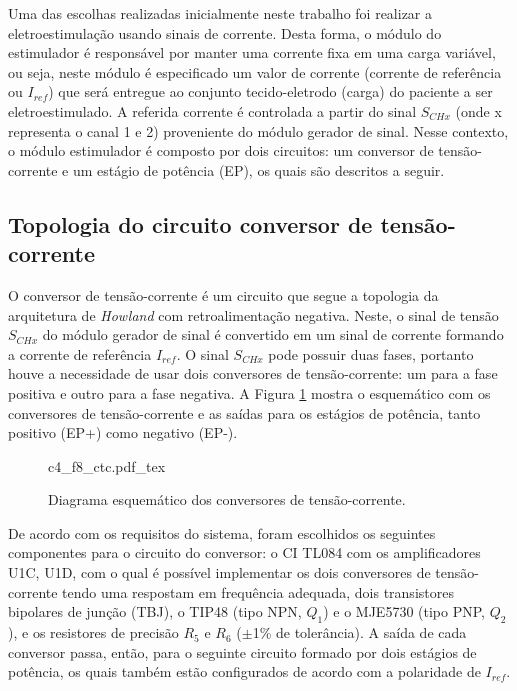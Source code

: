 Uma das escolhas realizadas inicialmente neste trabalho foi realizar a eletroestimulação usando sinais de corrente. Desta forma, o módulo do estimulador é responsável por manter uma corrente fixa em uma carga variável, ou seja, neste módulo é especificado um valor de corrente (corrente de referência ou $I_{ref}$) que será entregue ao conjunto tecido-eletrodo (carga) do paciente a ser eletroestimulado. A referida corrente é controlada a partir do sinal $S_{CHx}$ (onde x representa o canal 1 e 2) proveniente do módulo gerador de sinal. Nesse contexto, o módulo estimulador é composto por dois circuitos: um conversor de tensão-corrente e um estágio de potência (\acrshort{EP}), os quais são descritos a seguir.


\subsection*{Topologia do circuito conversor de tensão-corrente}
O conversor de tensão-corrente é um circuito que segue a topologia da arquitetura de \textit{Howland} com retroalimentação negativa. Neste, o sinal de tensão $S_{CHx}$ do módulo gerador de sinal é convertido em um sinal de corrente formando a corrente de referência $I_{ref}$. O sinal $S_{CHx}$ pode possuir duas fases, portanto houve a necessidade de usar dois conversores de tensão-corrente: um para a fase positiva e outro para a fase negativa. A Figura \ref{fig:c4_f8_ctc} mostra o esquemático com os conversores de tensão-corrente e as saídas para os estágios de potência, tanto positivo (\acrshort{EP}+) como negativo (\acrshort{EP}-). 

 
\begin{figure}[h]
    \centering %
    \small %
    \def\svgwidth{0.8\columnwidth}%
    {c4_f8_ctc.pdf_tex}
    \caption{Diagrama esquemático dos conversores de tensão-corrente.}
    \label{fig:c4_f8_ctc}
\end{figure}


De acordo com os requisitos do sistema, foram escolhidos os seguintes componentes para o circuito do conversor: o \acrshort{CI} TL084 com os amplificadores U1C, U1D, com o qual é possível implementar os dois conversores de tensão-corrente tendo uma respostam em frequência adequada, dois transistores bipolares de junção (\acrshort{TBJ}), o TIP48 (tipo NPN, $Q_1$) e o MJE5730 (tipo PNP, $Q_2$), e os resistores de precisão $R_5$ e $R_6$ ($\mathrm{\pm}$1\% de tolerância). A saída de cada conversor passa, então, para o seguinte circuito formado por dois estágios de potência, os quais também estão configurados de acordo com a polaridade de $I_{ref}$.

